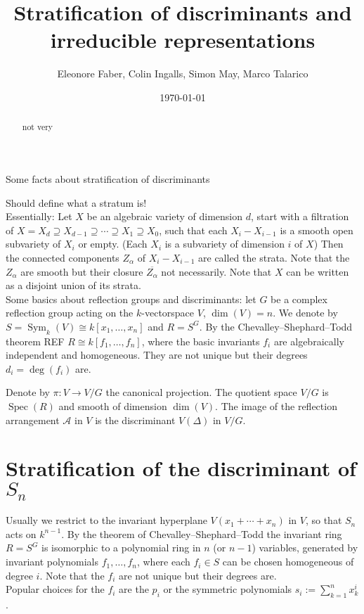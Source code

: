\documentclass[letter,11pt]{amsart}
\title{Stratification of discriminants and irreducible representations}
\author{Eleonore Faber, Colin Ingalls, Simon May, Marco Talarico}
\date{\today}
\DeclareMathOperator{\Spec}{Spec}
\DeclareMathOperator{\Sym}{Sym}
\theoremstyle{theorem}
\theoremstyle{remark}
\theoremstyle{definition}
\begin{document}
\begin{abstract}
not very

\end{abstract}



\maketitle

Some facts about stratification of discriminants


Should define what a stratum is! \\
Essentially: Let $X$ be an algebraic variety of dimension $d$, start with a filtration of $X= X_d \supseteq X_{d-1} \supseteq \cdots \supseteq X_1 \supseteq X_0$, such that each $X_i - X_{i-1}$ is a smooth open subvariety of $X_i$ or empty.  (Each $X_i$ is a subvariety of dimension $i$ of $X$)
Then the connected components $Z_\alpha$ of $X_i - X_{i-1}$ are called the strata.  Note that the $Z_\alpha$ are smooth but their  closure $\overline{Z_\alpha}$  not necessarily. Note that $X$ can be written as a disjoint union of its strata. \\



Some basics about reflection groups and discriminants: let  $G$ be a complex reflection group acting on the $k$-vectorspace $V$, $\dim(V)=n$. We denote by $S=\Sym_k(V) \cong  k[x_1, \ldots, x_n]$ and $R=S^G$. By the Chevalley--Shephard--Todd theorem REF $R \cong k[f_1, \ldots, f_n]$, where the basic invariants $f_i$ are algebraically independent and homogeneous. They are not unique but their degrees $d_i=\deg(f_i)$ are. 

Denote by $\pi: V \xrightarrow{} V/G$ the canonical projection. The quotient space $V/G$  is $\Spec(R)$ and smooth of dimension $\dim(V)$. The image of the reflection arrangement $\mathcal{A}$ in $V$ is the discriminant $V(\Delta)$ in $V/G$. 

\section{Stratification of the discriminant of $S_n$}

Usually we restrict to the invariant hyperplane $V(x_1 + \cdots + x_n)$ in $V$, so that $S_n$ acts on $k^{n-1}$. By the theorem of Chevalley--Shephard--Todd the invariant ring $R=S^G$ is isomorphic to a polynomial ring in $n$ (or $n-1$) variables, generated by invariant polynomials $f_1, \ldots, f_n$, where each $f_i \in S$ can be chosen homogeneous of degree $i$. Note that the $f_i$ are not unique but their degrees are. \\
Popular choices for the $f_i$ are the $p_i$ or the symmetric polynomials $s_i:=\sum_{k=1}^n x_k^i$. \\
\end{document}
